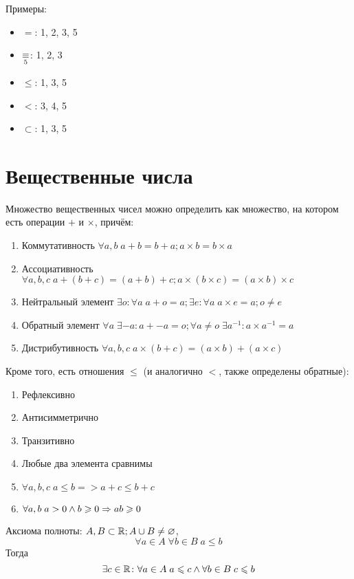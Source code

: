 Примеры:
\begin{itemize} 
\item $=$: 1, 2, 3, 5
\item $\mathop{\equiv}\limits_{5}$: 1, 2, 3
\item $\leqslant$: 1, 3, 5
\item $<$: 3, 4, 5
\item $\subset$: 1, 3, 5
\end{itemize}

\section{Вещественные числа}
\begin{Def}
Множество вещественных чисел можно определить как множество, на котором есть операции $+$ и $\times$, причём:
\begin{enumerate}
\item Коммутативность $\forall a, b\; a + b = b + a; a \times b = b \times a$
\item Ассоциативность $\forall a, b, c\; a + (b + c) = (a + b) + c; a \times (b \times c) = (a \times b) \times c$
\item Нейтральный элемент
$\exists o\colon \forall a\; a + o = a; \exists e\colon \forall a\;a \times e = a; o \ne e$
\item Обратный элемент
$\forall a\; \exists{-a}\colon a + -a = o; \forall a \ne o\; \exists a^{-1}: a \times a^{-1} = a$
\item Дистрибутивность $\forall a, b, c\; a \times (b + c) = (a \times b) + (a \times c)$
\end{enumerate}
Кроме того, есть отношения $\leqslant$ (и аналогично $<$, также определены обратные):
\begin{enumerate}
\item Рефлексивно
\item Антисимметрично
\item Транзитивно
\item Любые два элемента сравнимы
\item $\forall a, b, c\; a \leqslant b => a + c \leqslant b + c$
\item $\forall a, b\; a > 0 \land b \geqslant 0 \Rightarrow ab \geqslant 0$
\end{enumerate}
\end{Def}

Аксиома полноты: $A, B \subset \mathbb{R}; A \cup B \ne \varnothing$,
$$ \forall a \in A\; \forall b \in B\; a \leqslant b $$
Тогда $$\exists c \in \mathbb{R}\colon \forall a \in A\; a \leqslant c \land \forall b \in B\; c \leqslant b$$

